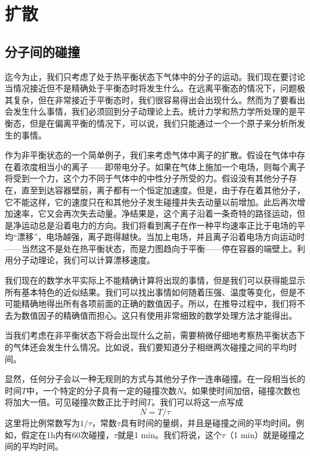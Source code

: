 \chapter{扩散}

\section{分子间的碰撞}

迄今为止，我们只考虑了处于热平衡状态下气体中的分子的运动。我们现在要讨论当情况接近但不是精确处于平衡态时将发生什么。在远离平衡态的情况下，问题极其复杂，但在非常接近于平衡态时，我们很容易得出会出现什么。然而为了要看出会发生什么事情，我们必须回到分子动理论上去。统计力学和热力学所处理的是平衡态，但是在偏离平衡的情况下，可以说，我们只能通过一个一个原子来分析所发生的事情。

作为非平衡状态的一个简单例子，我们来考虑气体中离子的扩散。假设在气体中存在着浓度相当小的离子——即带电分子。如果在气体上施加一个电场，则每个离子将受到一个力，这个力不同于气体中的中性分子所受的力。假设没有其他分子存在，直至到达容器壁前，离子都有一个恒定加速度。但是，由于存在着其他分子，它不能这样，它的速度只在和其他分子发生碰撞并失去动量以前增加。此后再次增加速率，它又会再次失去动量。净结果是，这个离子沿着一条奇特的路径运动，但是净运动总是沿着电力的方向。我们将看到离子在作一种平均速率正比于电场的平均“漂移”，电场越强，离子跑得越快。当加上电场，并且离子沿着电场方向运动时——当然这不是处在热平衡状态，而是力图趋向于平衡——停在容器的端壁上。利用分子动理论，我们可以计算漂移速度。

我们现在的数学水平实际上不能精确计算将出现的事情，但是我们可以获得能显示所有基本特色的近似结果。我们可以找出事情如何随着压强、温度等变化，但是不可能精确地得出所有各项前面的正确的数值因子。所以，在推导过程中，我们将不去为数值因子的精确值而担心。这只有使用非常细致的数学处理方法才能得出。

当我们考虑在非平衡状态下将会出现什么之前，需要稍微仔细地考察热平衡状态下的气体还会发生什么情况。比如说，我们要知道分子相继两次碰撞之间的平均时间。

显然，任何分子会以一种无规则的方式与其他分子作一连串碰撞。在一段相当长的时间$T$中，一个特定的分子具有一定的碰撞次数$N$。如果使时间加倍，碰撞次数也将加大一倍。可见碰撞次数正比于时间$T$。我们可以将这一点写成
\begin{equation}
    \label{Eq:I:43:1}
    N=T/\tau
\end{equation}
这里将比例常数写为$1/\tau$，常数$\tau$具有时间的量纲，并且是碰撞之间的平均时间。例如，假定在1h内有60次碰撞，$\tau$就是1 min。我们将说，这个$\tau$（1 min）就是碰撞之间的平均时间。


